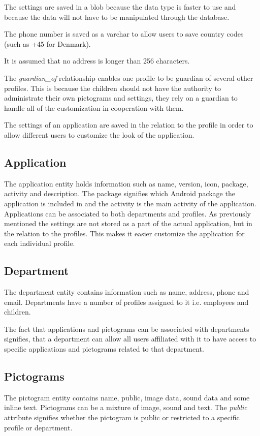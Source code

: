 The settings are saved in a blob because the data type is faster to use and because the data will not have to be manipulated through the database.

The phone number is saved as a varchar to allow users to save country codes (such as +45 for Denmark). 

It is assumed that no address is longer than 256 characters.

The \emph{guardian\_of} relationship enables one profile to be guardian of several other profiles. This is because the children should not have the authority to administrate their own pictograms and settings, they rely on a guardian to handle all of the customization in cooperation with them. 

The settings of an application are saved in the relation to the profile in order to allow different users to customize the look of the application.

\subsection{Application}
The application entity holds information such as name, version, icon, package, activity and description. 
The package signifies which Android package the application is included in and the activity is the main activity of the application. Applications can be associated to both departments and profiles. As previously mentioned the settings are not stored as a part of the actual application, but in the relation to the profiles. This makes it easier customize the application for each individual profile.
 
\subsection{Department}
The department entity contains information such as name, address, phone and email. Departments have a number of profiles assigned to it i.e. employees and children.

The fact that applications and pictograms can be associated with departments signifies, that a department can allow all users affiliated with it to have access to specific applications and pictograms related to that department.

\subsection{Pictograms}
The pictogram entity contains name, public, image data, sound data and some inline text. 
Pictograms can be a mixture of image, sound and text. The \emph{public} attribute signifies whether the pictogram is public or restricted to a specific profile or department. 

